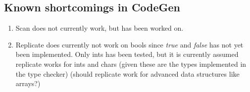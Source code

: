 \subsection{Known shortcomings in CodeGen}
\begin{enumerate}
	\item Scan does not currently work, but has been worked on.
	\item Replicate does currently not work on bools since \textit{true} and \textit{false} has not yet been implemented. Only ints has been tested, but it is currently assumed replicate works for ints and chars (given these are the types implemented in the type checker) (should replicate work for advanced data structures like arrays?) 
\end{enumerate}